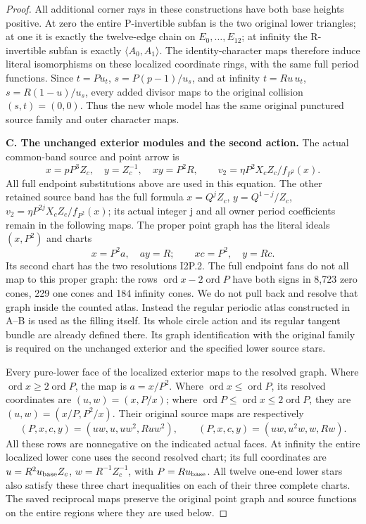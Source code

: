 \begin{proof}
All additional corner rays in these constructions have both base heights
positive.  At zero the entire P-invertible subfan is the two original lower
triangles; at one it is exactly the twelve-edge chain on
\(E_0,\ldots,E_{12}\); at infinity the R-invertible subfan is exactly
\(\langle A_0,A_1\rangle\).  The identity-character maps therefore induce
literal isomorphisms on these localized coordinate rings, with the same
full period functions.  Since \(t=Pu_t\), \(s=P(p-1)/u_s\), and at
infinity \(t=Ru\,u_t\), \(s=R(1-u)/u_s\), every added divisor maps to
the original collision \((s,t)=(0,0)\).  Thus the new whole model has the
same original punctured source family and outer character maps.

\medskip\noindent\textbf{C. The unchanged exterior modules and the second action.}
The actual common-band source and point arrow is
\[
x=pP^3Z_c,\quad y=Z_c^{-1},\quad xy=P^2R,
\qquad v_2=\eta P^2X_cZ_c/f_{P^2}(x).
\]
All full endpoint substitutions above are used in this equation.  The
other retained source band has the full formula
\(x=Q^jZ_c\), \(y=Q^{1-j}/Z_c\),
\(v_2=\eta P^{2j}X_cZ_c/f_{P^2}(x)\); its actual integer j and all
owner period coefficients remain in the following maps.  The
proper point graph has the literal ideals \((x,P^2)\) and charts
\[
x=P^2a,\quad ay=R;\qquad xc=P^2,\quad y=Rc.
\]
Its second chart has the two resolutions I2P.2.  The full endpoint fans
do not all map to this proper graph: the rows
\(\operatorname{ord}x-2\operatorname{ord}P\) have both signs in
8,723 zero cones, 229 one cones and 184 infinity cones.  We do not pull
back and resolve that graph inside the counted atlas.  Instead the
regular periodic atlas constructed in A--B is used as the filling itself.
Its whole circle action and its regular tangent bundle are already
defined there.  Its graph identification with the original family is
required on the unchanged exterior and the specified lower source stars.

Every pure-lower face of the localized exterior maps to the resolved
graph.  Where \(\operatorname{ord}x\geq2\operatorname{ord}P\), the
map is \(a=x/P^2\).  Where
\(\operatorname{ord}x\leq\operatorname{ord}P\), its resolved coordinates
are \((u,w)=(x,P/x)\); where
\(\operatorname{ord}P\leq\operatorname{ord}x\leq2\operatorname{ord}P\),
they are \((u,w)=(x/P,P^2/x)\).  Their original source maps are respectively
\[
(P,x,c,y)=(uw,u,uw^2,Ruw^2),\qquad
(P,x,c,y)=(uw,u^2w,w,Rw).
\]
All these rows are nonnegative on the indicated actual faces.  At
infinity the entire localized lower cone uses the second resolved chart;
its full coordinates are \(u=R^2u_{\rm base}Z_c\),
\(w=R^{-1}Z_c^{-1}\), with \(P=Ru_{\rm base}\).  All twelve one-end
lower stars also satisfy these three chart inequalities on each of their
three complete charts.  The saved reciprocal maps preserve the original
point graph and source functions on the entire regions where they are
used below.


\end{proof}
